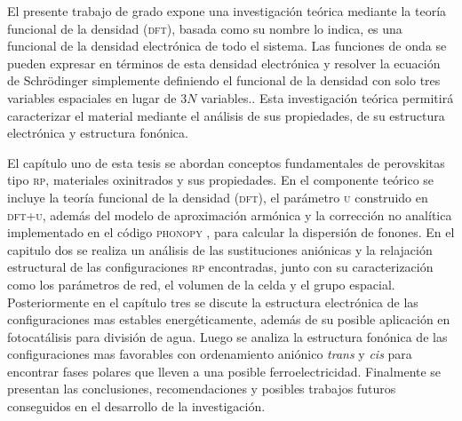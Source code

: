 El presente trabajo de grado expone una investigación teórica mediante la teoría funcional de la densidad (\textsc{dft}), basada como su nombre lo indica, es una funcional de la densidad electrónica de todo el sistema. Las funciones de onda se pueden expresar en términos de esta densidad electrónica y resolver la ecuación de Schrödinger simplemente definiendo el funcional de la densidad con solo tres variables espaciales en lugar de $3N$ variables.\cite{ACGarcia2016phd}. Esta investigación teórica permitirá caracterizar el material mediante el análisis de sus propiedades, de su estructura electrónica y estructura fonónica.

El capítulo uno de esta tesis se abordan conceptos fundamentales de perovskitas tipo \textsc{rp}, materiales oxinitrados y sus propiedades. En el componente teórico se incluye la teoría funcional de la densidad (\textsc{dft}), el parámetro \textsc{u} construido en \textsc{dft+u}, además del modelo de aproximación armónica y la corrección no analítica \cite{Wang_2010-nac} implementado en el código \textsc{phonopy} \cite{Togo2015phonopy}, para calcular la dispersión de fonones. En el capitulo dos se realiza un análisis de las sustituciones aniónicas y la relajación estructural de las configuraciones \textsc{rp} encontradas, junto con su caracterización como los parámetros de red, el volumen de la celda y el grupo espacial. Posteriormente en el capítulo tres se discute la estructura electrónica de las configuraciones mas estables energéticamente, además de su posible aplicación en fotocatálisis para división de agua. Luego se analiza la estructura fonónica de las configuraciones mas favorables con ordenamiento aniónico \emph{trans} y \emph{cis} para encontrar fases polares que lleven a una posible ferroelectricidad. Finalmente se presentan las conclusiones, recomendaciones y posibles trabajos futuros conseguidos en el desarrollo de la investigación.



